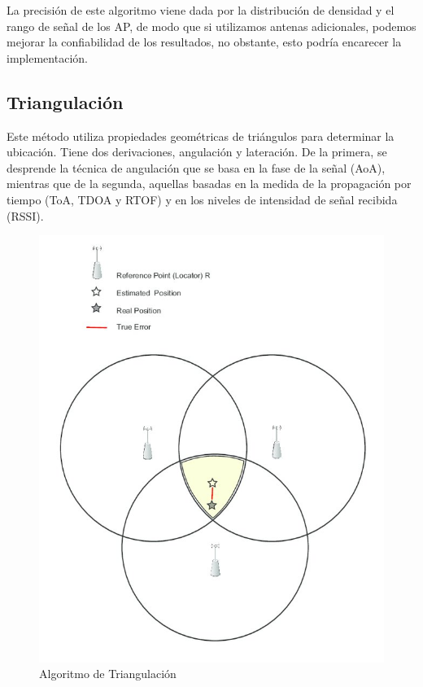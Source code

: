 La precisión de este algoritmo viene dada por la distribución de densidad y el rango de señal de los AP, de modo que si utilizamos antenas adicionales, podemos mejorar la confiabilidad de los resultados, no obstante, esto podría encarecer la implementación.

\subsection{Triangulación}
Este método utiliza propiedades geométricas de triángulos para determinar la ubicación. Tiene dos derivaciones, angulación y lateración. De la primera, se desprende la  técnica de angulación que se basa en la fase de la señal (AoA), mientras que de la segunda, aquellas basadas en la medida de la propagación por tiempo (ToA, TDOA y RTOF) y en los niveles de intensidad de señal recibida (RSSI). 


\begin{figure}[h!]
    \centering
    \includegraphics[scale=1]{./images/trilat}
    \caption{Algoritmo de Triangulación}
    \label{fig:Triangulación}
\end{figure}

